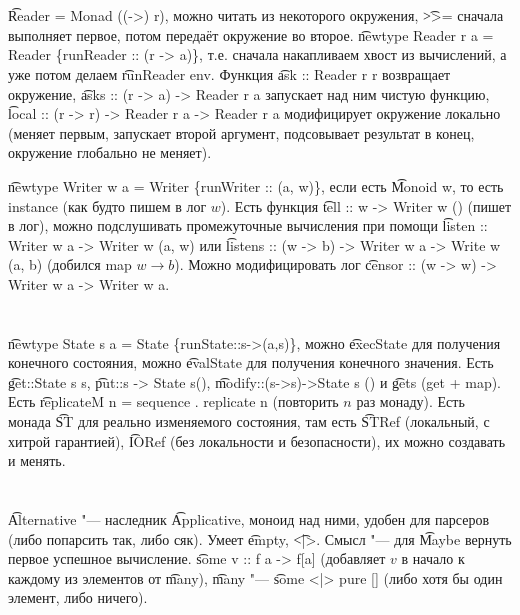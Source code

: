 \section{} %
\t{Reader = Monad ((->) r)}, можно читать из некоторого окружения, \t{>>=} сначала выполняет первое, потом передаёт окружение во второе.
\t{newtype Reader r a = Reader \{runReader :: (r -> a)\}}, т.е. сначала накапливаем хвост из вычислений, а уже потом
делаем \t{runReader env}.
Функция \t{ask :: Reader r r} возвращает окружение, \t{asks :: (r -> a) -> Reader r a} запускает над ним чистую функцию,
\t{local :: (r -> r) -> Reader r a -> Reader r a} модифицирует окружение локально (меняет первым, запускает второй аргумент, подсовывает
результат в конец, окружение глобально не меняет).

\t{newtype Writer w a = Writer \{runWriter :: (a, w)\}}, если есть \t{Monoid w}, то есть instance (как будто пишем в лог $w$).
Есть функция \t{tell :: w -> Writer w ()} (пишет в лог), можно подслушивать промежуточные вычисления при помощи
\t{listen :: Writer w a -> Writer w (a, w)} или \t{listens :: (w -> b) -> Writer w a -> Write w (a, b)} (добился map $w \to b$).
Можно модифицировать лог \t{censor :: (w -> w) -> Writer w a -> Writer w a}.

\section{} %
\t{newtype State s a = State \{runState::s->(a,s)\}}, можно \t{execState} для получения конечного состояния,
можно \t{evalState} для получения конечного значения.
Есть \t{get::State s s}, \t{put::s -> State s()}, \t{modify::(s->s)->State s ()} и \t{gets} (get + map).
Есть \t{replicateM n = sequence . replicate n} (повторить $n$ раз монаду).
Есть монада \t{ST} для реально изменяемого состояния, там есть \t{STRef} (локальный, с хитрой гарантией), \t{IORef} (без локальности и безопасности),
их можно создавать и менять.

\section{} %
\t{Alternative} "--- наследник \t{Applicative}, моноид над ними, удобен для парсеров (либо попарсить так, либо сяк).
Умеет \t{empty}, \t{<|>}.
Смысл "--- для \t{Maybe} вернуть первое успешное вычисление.
\t{some v :: f a -> f[a]} (добавляет $v$ в начало к каждому из элементов от \t{many}),
\t{many} "--- \t{some <|> pure []} (либо хотя бы один элемент, либо ничего).

